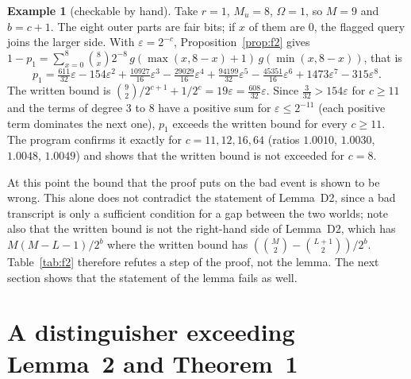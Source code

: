 \documentclass[11pt,a4paper]{article}
\theoremstyle{definition}
\newtheorem{example}{Example}
\theoremstyle{remark}
\begin{document}
\begin{example}[checkable by hand]\label{ex:small}
Take $r = 1$, $M_u = 8$, $\Omega = 1$, so $M = 9$ and $b = c + 1$. The eight outer parts are fair bits; if $x$ of them are $0$,
the flagged query joins the larger side. With $\varepsilon = 2^{-c}$, Proposition~\ref{prop:f2} gives
$1 - p_1 = \sum_{x=0}^{8} \binom{8}{x} 2^{-8}\, g(\max(x, 8-x) + 1)\, g(\min(x, 8-x))$, that is
\[ p_1 = \tfrac{611}{32}\varepsilon - 154\varepsilon^2 + \tfrac{10927}{16}\varepsilon^3 - \tfrac{29029}{16}\varepsilon^4
 + \tfrac{94199}{32}\varepsilon^5 - \tfrac{45351}{16}\varepsilon^6 + 1473\varepsilon^7 - 315\varepsilon^8 . \]
The written bound is $\binom{9}{2}/2^{c+1} + 1/2^c = 19\varepsilon = \tfrac{608}{32}\varepsilon$. Since
$\tfrac{3}{32} > 154\varepsilon$ for $c \ge 11$ and the terms of degree $3$ to $8$ have a positive sum for $\varepsilon \le 2^{-11}$
(each positive term dominates the next one), $p_1$ exceeds the written bound for every $c \ge 11$. The program confirms
it exactly for $c = 11, 12, 16, 64$ (ratios $1.0010$, $1.0030$, $1.0048$, $1.0049$) and shows that the written bound is not exceeded for $c = 8$.
\end{example}

At this point the bound that the proof puts on the bad event is shown to be wrong. This alone does not contradict the
statement of Lemma~D2, since a bad transcript is only a sufficient condition for a gap between the two
worlds; note also that the written bound is not the right-hand side of Lemma~D2, which has $M(M-L-1)/2^b$ where the
written bound has $(\binom{M}{2} - \binom{L+1}{2})/2^b$. Table~\ref{tab:f2} therefore refutes a step of the proof, not the lemma. The next
section shows that the statement of the lemma fails as well.

\section{A distinguisher exceeding Lemma~2 and Theorem~1}\label{sec:dist}
\end{document}
